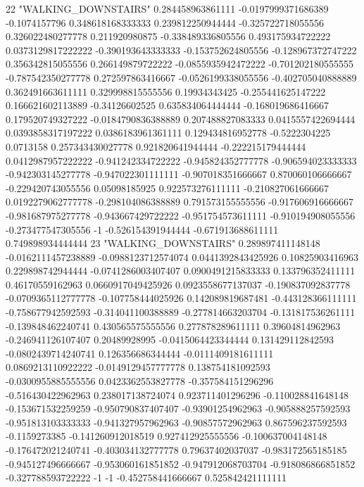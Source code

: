 22 "WALKING_DOWNSTAIRS" 0.284458963861111 -0.0197999371686389 -0.1074157796 0.348618168333333 0.239812250944444 -0.325722718055556 0.326022480277778 0.211920980875 -0.338489336805556 0.493175934722222 0.0373129817222222 -0.390193643333333 -0.153752624805556 -0.128967372747222 0.356342815055556 0.266149879722222 -0.0855935942472222 -0.701202180555555 -0.787542350277778 0.272597863416667 -0.0526199338055556 -0.402705040888889 0.362491663611111 0.329998815555556 0.19934343425 -0.255441625147222 0.166621602113889 -0.34126602525 0.635834064444444 -0.168019686416667 0.179520749327222 -0.0184790836388889 0.207488827083333 0.0415557422694444 0.0393858317197222 0.0386183961361111 0.129434816952778 -0.5222304225 0.0713158 0.257343430027778 0.921820641944444 -0.222215179444444 0.0412987957222222 -0.941242334722222 -0.945824352777778 -0.906594023333333 -0.942303145277778 -0.947022301111111 -0.907018351666667 0.870060106666667 -0.229420743055556 0.05098185925 0.922573276111111 -0.210827061666667 0.0192279062777778 -0.298104086388889 0.791573155555556 -0.917606916666667 -0.981687975277778 -0.943667429722222 -0.951754573611111 -0.910194908055556 -0.273477547305556 -1 -0.526154391944444 -0.671913688611111 0.749898934444444
23 "WALKING_DOWNSTAIRS" 0.289897411148148 -0.0162111457238889 -0.0988123712574074 0.0441392843425926 0.10825903416963 0.229898742944444 -0.0741286003407407 0.0900491215833333 0.133796352411111 0.46170559162963 0.0660917049425926 0.0923558677137037 -0.190837092837778 -0.0709365112777778 -0.107758444025926 0.142089819687481 -0.443128366111111 -0.758677942592593 -0.314041100388889 -0.277814663203704 -0.131817536261111 -0.139848462240741 0.430565575555556 0.277878289611111 0.39604814962963 -0.246941126107407 0.20489928995 -0.0415064423344444 0.131429112842593 -0.0802439714240741 0.126356686344444 -0.0111409181611111 0.0869213110922222 -0.0149129457777778 0.138754181092593 -0.0300955885555556 0.0423362553827778 -0.357584151296296 -0.516430422962963 0.238017138724074 0.923711401296296 -0.110028841648148 -0.153671532259259 -0.950790837407407 -0.93901254962963 -0.905888257592593 -0.951813103333333 -0.941327957962963 -0.90857572962963 0.867596237592593 -0.1159273385 -0.141260912018519 0.927412925555556 -0.100637004148148 -0.176472021240741 -0.403034132777778 0.79637402037037 -0.983172565185185 -0.945127496666667 -0.953060161851852 -0.947912068703704 -0.918086866851852 -0.327788593722222 -1 -1 -0.452758441666667 0.525842421111111

